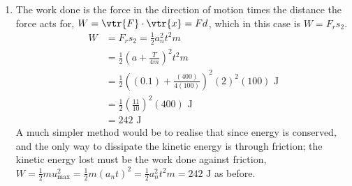 \begin{problem}[A1987PSIIQ9a]
{\begin{enumerate}
	\item The work done is the force in the direction of motion times the distance the force acts for, $W = \vtr{F}\cdot\vtr{x} = Fd$, which in this case is $W = F_{r}s_{2}$.
\begin{align*} W &= F_{r}s_{2} = \frac{1}{2} a_{n}^{2} t^{2} m \\ 
	&= \frac{1}{2} \left( a +\frac{T}{4m} \right)^{2} t^{2} m \\
	&= \frac{1}{2} \left( (0.1) + \frac{(400)}{4(100)} \right)^{2} (2)^{2} (100) \textrm{ J} \\
	&= \frac{1}{2} \left( \frac{11}{10} \right)^{2} (400) \textrm{ J} \\
	&= 242 \textrm{ J}\end{align*}
A much simpler method would be to realise that since energy is conserved, and the only way to dissipate the kinetic energy is through friction; the kinetic energy lost must be the work done against friction, $W = \frac{1}{2}mu_{\textrm{max}}^{2} = \frac{1}{2}m \left( a_{n} t \right)^{2} = \frac{1}{2} a_{n}^{2} t^{2} m = 242 \textrm{ J}$ as before.
\end{enumerate}}
\end{problem}